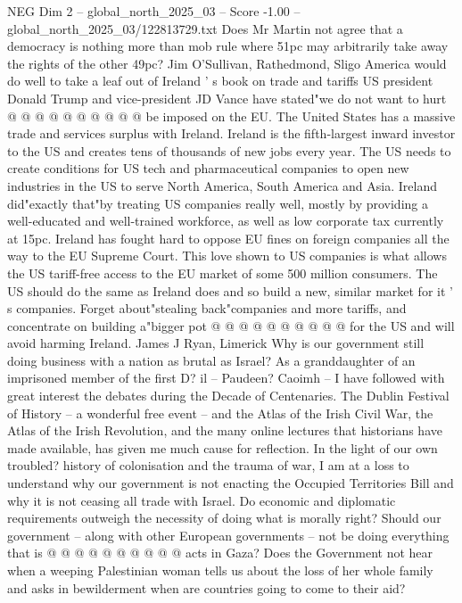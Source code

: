 \begin{textsample}{NEG Dim 2 – global\_north\_2025\_03 – Score -1.00 – global\_north\_2025\_03/122813729.txt}
Does Mr Martin not agree that a democracy is nothing more than mob rule where 51pc may arbitrarily take away the rights of the other 49pc?
Jim O'Sullivan, Rathedmond, Sligo America would do well to take a leaf out of Ireland ' s book on trade and tariffs US president Donald Trump and vice-president JD Vance have stated"we do not want to hurt @ @ @ @ @ @ @ @ @ @ be imposed on the EU.
The United States has a massive trade and services surplus with Ireland.
Ireland is the fifth-largest inward investor to the US and creates tens of thousands of new jobs every year.
The US needs to create conditions for US tech and pharmaceutical companies to open new industries in the US to serve North America, South America and Asia.
Ireland did"exactly that"by treating US companies really well, mostly by providing a well-educated and well-trained workforce, as well as low corporate tax currently at 15pc.
Ireland has fought hard to oppose EU fines on foreign companies all the way to the EU Supreme Court.
This love shown to US companies is what allows the US tariff-free access to the EU market of some 500 million consumers.
The US should do the same as Ireland does and so build a new, similar market for it ' s companies.
Forget about"stealing back"companies and more tariffs, and concentrate on building a"bigger pot @ @ @ @ @ @ @ @ @ @ for the US and will avoid harming Ireland.
James J Ryan, Limerick Why is our government still doing business with a nation as brutal as Israel?
As a granddaughter of an imprisoned member of the first D? il -- Paudeen?
Caoimh -- I have followed with great interest the debates during the Decade of Centenaries.
The Dublin Festival of History -- a wonderful free event -- and the Atlas of the Irish Civil War, the Atlas of the Irish Revolution, and the many online lectures that historians have made available, has given me much cause for reflection.
In the light of our own troubled? history of colonisation and the trauma of war, I am at a loss to understand why our government is not enacting the Occupied Territories Bill and why it is not ceasing all trade with Israel.
Do economic and diplomatic requirements outweigh the necessity of doing what is morally right?
Should our government -- along with other European governments -- not be doing everything that is @ @ @ @ @ @ @ @ @ @ acts in Gaza?
Does the Government not hear when a weeping Palestinian woman tells us about the loss of her whole family and asks in bewilderment when are countries going to come to their aid?

\end{textsample}
